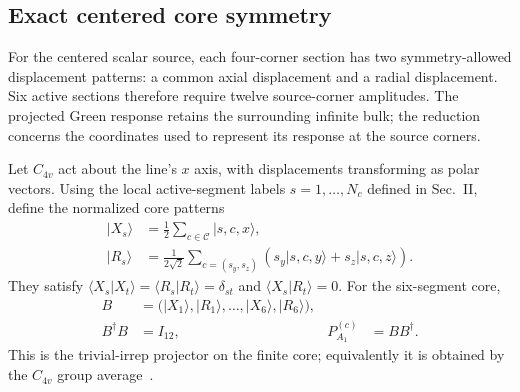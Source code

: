 \documentclass[10pt,aps,pre,reprint,floatfix,notitlepage,nofootinbib]{revtex4-2}
\newcommand{\Cc}{\mathcal C}
\newcommand{\PAone}{P_{A_1}^{(c)}}
\begin{document}
\subsection{Exact centered core symmetry}
\label{sec:s4-core-symmetry}

For the centered scalar source, each four-corner section has two symmetry-allowed displacement patterns: a common axial displacement and a radial displacement. Six active sections therefore require twelve source-corner amplitudes. The projected Green response retains the surrounding infinite bulk; the reduction concerns the coordinates used to represent its response at the source corners.

Let $C_{4v}$ act about the line's $x$ axis, with displacements transforming as polar vectors.  Using the local active-segment labels $s=1,\ldots,N_c$ defined in Sec.~II, define the normalized core patterns
\begin{align}
  |X_s\rangle
  &=\frac12\sum_{c\in\Cc}|s,c,x\rangle,\\
  |R_s\rangle
  &=\frac{1}{2\sqrt2}
   \sum_{c=(s_y,s_z)}
   \left(s_y|s,c,y\rangle+s_z|s,c,z\rangle\right).
  \label{eq:s4-XR-basis}
\end{align}
They satisfy
$\langle X_s|X_t\rangle=\langle R_s|R_t\rangle=\delta_{st}$ and
$\langle X_s|R_t\rangle=0$.  For the six-segment core,
\begin{align}
  B&=\bigl(|X_1\rangle,|R_1\rangle,\ldots,
  |X_6\rangle,|R_6\rangle\bigr),\\
  B^\dagger B&=I_{12},
  &\PAone&=BB^\dagger.
  \label{eq:s4-core-basis}
\end{align}
This is the trivial-irrep projector on the finite core; equivalently it is obtained by the $C_{4v}$ group average~\cite{Dresselhaus2008}.
\end{document}
